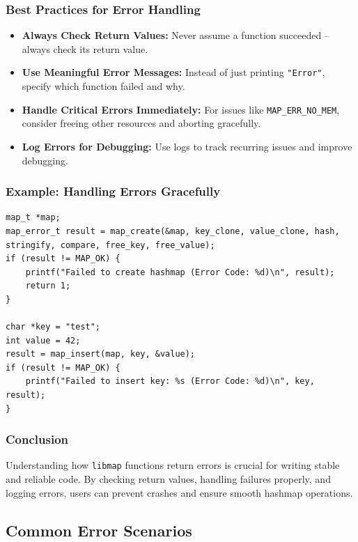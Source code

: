 \documentclass[titlepage]{article}
\begin{document}
\subsubsection{Best Practices for Error Handling}

\begin{itemize}
    \item \textbf{Always Check Return Values:} Never assume a function succeeded -- always check its return value.
    \item \textbf{Use Meaningful Error Messages:} Instead of just printing \texttt{"Error"}, specify which function failed and why.
    \item \textbf{Handle Critical Errors Immediately:} For issues like \texttt{MAP\_ERR\_NO\_MEM}, consider freeing other resources and aborting gracefully.
    \item \textbf{Log Errors for Debugging:} Use logs to track recurring issues and improve debugging.
\end{itemize}

\subsubsection{Example: Handling Errors Gracefully}

\begin{verbatim}
map_t *map;
map_error_t result = map_create(&map, key_clone, value_clone, hash, stringify, compare, free_key, free_value);
if (result != MAP_OK) {
    printf("Failed to create hashmap (Error Code: %d)\n", result);
    return 1;
}

char *key = "test";
int value = 42;
result = map_insert(map, key, &value);
if (result != MAP_OK) {
    printf("Failed to insert key: %s (Error Code: %d)\n", key, result);
}
\end{verbatim}

\subsubsection{Conclusion}

Understanding how \texttt{libmap} functions return errors is crucial for writing stable and reliable code. By checking return values, handling failures properly, and logging errors, users can prevent crashes and ensure smooth hashmap operations.


\subsection{Common Error Scenarios}
\end{document}
